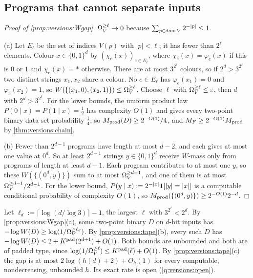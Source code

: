 \subsection{Programs that cannot separate inputs}\label{app:versions:Wgap}

\begin{proof}[Proof of \cref{prop:versions:Wgap}]
$\Omega_{V}^{\ge \ell}\to0$ because $\sum_{p\in\operatorname{dom} V}2^{-|p|}\le1$.

(a) Let $E_\ell$ be the set of indices $V(p)$ with $|p|<\ell$; it has fewer than $2^\ell$ elements. Colour $x\in\{0,1\}^d$ by $(\chi_e(x))_{e\in E_\ell}$, where $\chi_e(x)=\varphi_e(x)$ if this is $0$ or $1$ and $\chi_e(x)=*$ otherwise. There are at most $3^{2^\ell}$ colours, so if $2^d>3^{2^\ell}$ two distinct strings $x_1,x_2$ share a colour. No $e\in E_\ell$ has $\varphi_e(x_1)=0$ and $\varphi_e(x_2)=1$, so $W(\{(x_1,0),(x_2,1)\})\le\Omega_{V}^{\ge \ell}$. Choose $\ell$ with $\Omega_{V}^{\ge \ell}\le\varepsilon$, then $d$ with $2^d>3^{2^\ell}$. For the lower bounds, the uniform product law $P(0\mid x)=P(1\mid x)=\frac12$ has complexity $O(1)$ and gives every two-point binary data set probability $\frac14$; so $M_{\mathrm{prod}}(D)\ge2^{-O(1)}/4$, and $M_{F}\ge2^{-O(1)}M_{\mathrm{prod}}$ by \cref{thm:versions:chain}.

(b) Fewer than $2^{d-1}$ programs have length at most $d-2$, and each gives at most one value at $0^d$. So at least $2^{d-1}$ strings $y\in\{0,1\}^d$ receive $W$-mass only from programs of length at least $d-1$. Each program contributes to at most one $y$, so these $W(\{(0^d,y)\})$ sum to at most $\Omega_{V}^{\ge d-1}$, and one of them is at most $\Omega_{V}^{\ge d-1}/2^{d-1}$. For the lower bound, $P(y\mid x):=2^{-|x|}\mathbf{1}[|y|=|x|]$ is a computable conditional probability of complexity $O(1)$, so $M_{\mathrm{prod}}(\{(0^d,y)\})\ge2^{-O(1)}2^{-d}$.
\end{proof}

\begin{remark}\label{rem:versions:Wrate}
Let $\ell_d:=\lceil\log(d/\log3)\rceil-1$, the largest $\ell$ with $3^{2^\ell}<2^d$. By \cref{prop:versions:Wgap}(a), some two-point binary $D$ on $d$-bit inputs has $-\log W(D)\ge\log(1/\Omega_{V}^{\ge \ell_d})$. By \cref{prop:versions:tape}(b), every such $D$ has $-\log W(D)\le2+K^{\mathrm{pad}}(2^{d+1})+O(1)$. Both bounds are unbounded and both are of padded type, since $\log(1/\Omega_{V}^{\ge \ell})\le K^{\mathrm{pad}}(\ell)+O(1)$. By \cref{prop:versions:tape}(c) the gap is at most $2\log(h(d)+2)+O_h(1)$ for every computable, nondecreasing, unbounded $h$. Its exact rate is open (\cref{q:versions:open}).
\end{remark}

